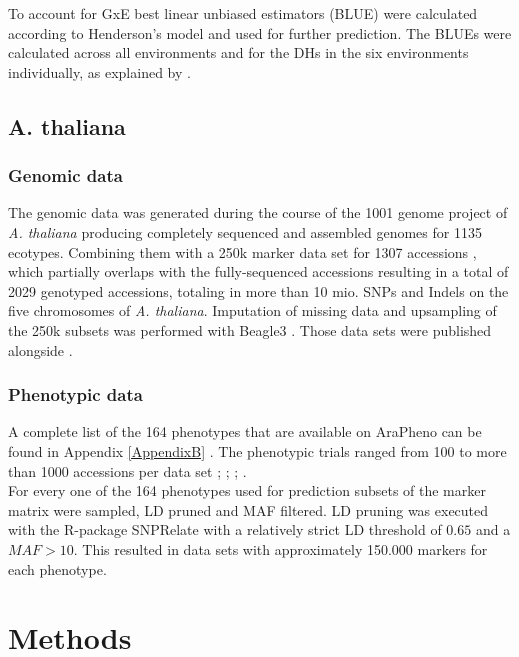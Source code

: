 To account for GxE best linear unbiased estimators (BLUE) were calculated according to
Henderson's model \cite{henderson1975best} and used for further prediction. The BLUEs were
calculated across all environments and for the DHs in the six environments individually,
as explained by \cite{holker2019european}.


\subsection{A. thaliana}

\subsubsection{Genomic data}

The genomic data was generated during the course of the 1001 genome project of
\textit{A. thaliana} \cite{1001genome} producing completely sequenced and assembled
genomes for 1135 ecotypes. Combining them with a 250k marker data set for 1307 accessions
\cite{horton2012genome}, which partially overlaps with the fully-sequenced accessions resulting
in a total of 2029 genotyped accessions, totaling in more than 10 mio. SNPs and Indels on
the five chromosomes of \textit{A. thaliana}. Imputation of missing data and upsampling of
the 250k subsets was performed with Beagle3
\cite{browning2007rapid}. Those data sets were published alongside \cite{tong2019}. \\


\subsubsection{Phenotypic data}
A complete list of the 164 phenotypes that are available on AraPheno can be found in
Appendix \ref{AppendixB} \cite{seren2016arapheno}. The phenotypic trials ranged from 100
to more than 1000 accessions per data set \cite{atwell2010}; \cite{li2010}; \cite{me2014};
\cite{strauch2015}.\\
For every one of the 164 phenotypes used for prediction subsets of the marker matrix were
sampled, LD pruned and MAF filtered. LD pruning was executed with the R-package SNPRelate
\cite{zheng2013tutorial} with a relatively strict LD threshold of $0.65$ and a
$MAF > 10 $. This resulted in data sets with approximately 150.000 markers for each
phenotype.

\section{Methods}

